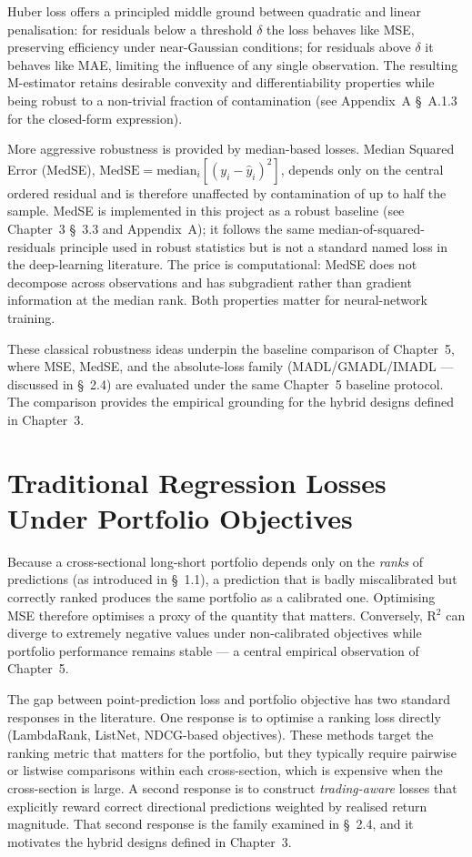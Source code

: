 Huber loss offers a principled middle ground between quadratic and linear penalisation: for residuals below a threshold $\delta$ the loss behaves like MSE, preserving efficiency under near-Gaussian conditions; for residuals above $\delta$ it behaves like MAE, limiting the influence of any single observation. The resulting M-estimator retains desirable convexity and differentiability properties while being robust to a non-trivial fraction of contamination (see Appendix~A \S~A.1.3 for the closed-form expression).

More aggressive robustness is provided by median-based losses. Median Squared Error (MedSE), $\mathrm{MedSE} = \mathrm{median}_i[(y_i - \hat{y}_i)^2]$, depends only on the central ordered residual and is therefore unaffected by contamination of up to half the sample. MedSE is implemented in this project as a robust baseline (see Chapter~3 \S~3.3 and Appendix~A); it follows the same median-of-squared-residuals principle used in robust statistics but is not a standard named loss in the deep-learning literature. The price is computational: MedSE does not decompose across observations and has subgradient rather than gradient information at the median rank. Both properties matter for neural-network training.

These classical robustness ideas underpin the baseline comparison of Chapter~5, where MSE, MedSE, and the absolute-loss family (MADL/GMADL/IMADL --- discussed in \S~2.4) are evaluated under the same Chapter~5 baseline protocol. The comparison provides the empirical grounding for the hybrid designs defined in Chapter~3.

\section{Traditional Regression Losses Under Portfolio Objectives}\label{sec:traditional_regression_losses}

Because a cross-sectional long-short portfolio depends only on the \textit{ranks} of predictions (as introduced in \S~1.1), a prediction that is badly miscalibrated but correctly ranked produces the same portfolio as a calibrated one. Optimising MSE therefore optimises a proxy of the quantity that matters. Conversely, R$^{2}$ can diverge to extremely negative values under non-calibrated objectives while portfolio performance remains stable --- a central empirical observation of Chapter~5.

The gap between point-prediction loss and portfolio objective has two standard responses in the literature. One response is to optimise a ranking loss directly (LambdaRank, ListNet, NDCG-based objectives). These methods target the ranking metric that matters for the portfolio, but they typically require pairwise or listwise comparisons within each cross-section, which is expensive when the cross-section is large. A second response is to construct \textit{trading-aware} losses that explicitly reward correct directional predictions weighted by realised return magnitude. That second response is the family examined in \S~2.4, and it motivates the hybrid designs defined in Chapter~3.

